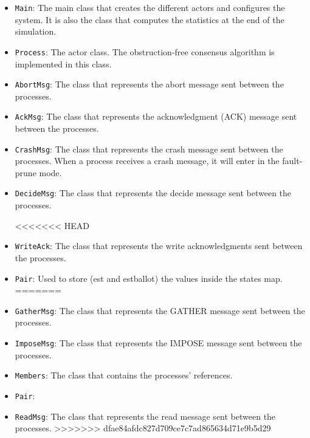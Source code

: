 \documentclass{article}
\begin{document}
\begin{itemize}
    \item \texttt{Main}: The main class that creates the different actors and configures the system. It is also the class that computes the statistics at the end of the simulation.

    \item \texttt{Process}: The actor class. The obstruction-free consensus algorithm is implemented in this class.

    \item \texttt{AbortMsg}: The class that represents the abort message sent between the processes.

    \item \texttt{AckMsg}: The class that represents the acknowledgment (ACK) message sent between the processes.

    \item \texttt{CrashMsg}: The class that represents the crash message sent between the processes. When a process receives a crash message, it will enter in the fault-prune mode.

    \item \texttt{DecideMsg}: The class that represents the decide message sent between the processes.

<<<<<<< HEAD
    \item \texttt{WriteAck}: The class that represents the write acknowledgments sent between the processes.

    \item \texttt{Pair}: Used to store (est and estballot) the values inside the states map.
=======
    \item \texttt{GatherMsg}: The class that represents the GATHER message sent between the processes.
    
    \item \texttt{ImposeMsg}: The class that represents the IMPOSE message sent between the processes.
    
    \item \texttt{Members}: The class that contains the processes' references.
    
    \item \texttt{Pair}:  
    
    \item \texttt{ReadMsg}: The class that represents the read message sent between the processes.
>>>>>>> dfae84afdc827d709ce7c7ad865634d71e9b5d29
\end{itemize}
\end{document}
